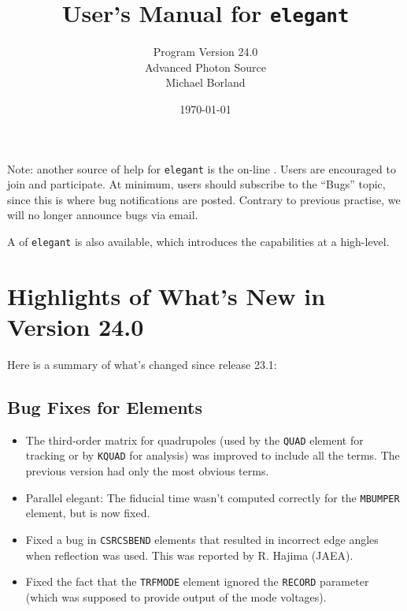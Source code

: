 \documentclass[11pt]{article}
\begin{document}
\title{User's Manual for {\tt elegant}}
\author{Program Version 24.0\\Advanced Photon Source\\Michael Borland\\ \date{\today}}
\maketitle

Note: another source of help for {\tt elegant} is the on-line
.
Users are encouraged to join and participate.  At minimum, users should subscribe to the ``Bugs'' topic,
since this is where bug notifications are posted.  Contrary to previous practise, we will no longer announce
bugs via email.

A  of {\tt elegant} is also available, which introduces the capabilities
at a high-level.

\section{Highlights of What's New in Version 24.0}

Here is a summary of what's changed since release 23.1:

\subsection{Bug Fixes for Elements}

\begin{itemize}
\item The third-order matrix for quadrupoles (used by the {\tt QUAD} element for tracking or by
  {\tt KQUAD} for analysis) was improved to include all the terms.  The previous version had only
  the most obvious terms.
\item Parallel elegant: The fiducial time wasn't computed correctly for the {\tt MBUMPER} element, but is now fixed.
\item Fixed a bug in {\tt CSRCSBEND} elements that resulted in incorrect edge angles when reflection was used.  This was reported
 by R. Hajima (JAEA).
\item Fixed the fact that the {\tt TRFMODE} element ignored the {\tt RECORD} parameter (which was supposed to provide output
  of the mode voltages).
\end{itemize}
\end{document}
